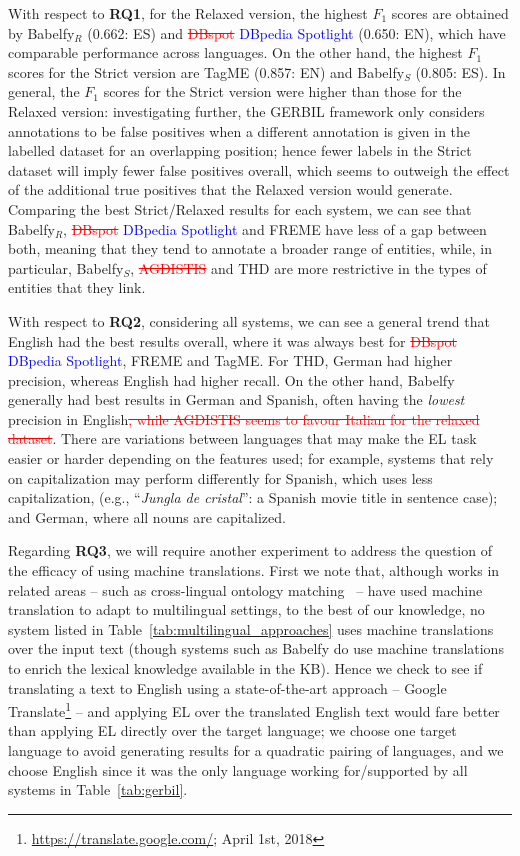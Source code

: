 \documentclass{llncs}
\begin{document}
With respect to \textbf{RQ1}, for the Relaxed version, the highest $F_1$ scores are obtained by Babelfy$_R$ (0.662: ES) and \textcolor{red}{\st{DBspot}} \textcolor{blue}{DBpedia Spotlight} (0.650: EN), which have comparable performance across languages. On the other hand, the highest $F_1$ scores for the Strict version are TagME (0.857: EN) and Babelfy$_S$ (0.805: ES). In general, the $F_1$ scores for the Strict version were higher than those for the Relaxed version: investigating further, the GERBIL framework only considers annotations to be false positives when a different annotation is given in the labelled dataset for an overlapping position; hence fewer labels in the Strict dataset will imply fewer false positives overall, which seems to outweigh the effect of the additional true positives that the Relaxed version would generate. Comparing the best Strict/Relaxed results for each system, we can see that Babelfy$_R$, \textcolor{red}{\st{DBspot}} \textcolor{blue}{DBpedia Spotlight} and FREME have less of a gap between both, meaning that they tend to annotate a broader range of entities, while, in particular, Babelfy$_S$, \textcolor{red}{\st{AGDISTIS}} and THD are more restrictive in the types of entities that they link.

With respect to \textbf{RQ2}, considering all systems, we can see a general trend that English had the best results overall, where it was always best for \textcolor{red}{\st{DBspot}} \textcolor{blue}{DBpedia Spotlight}, FREME and TagME. For THD, German had higher precision, whereas English had higher recall. On the other hand, Babelfy generally had best results in German and Spanish, often having the \textit{lowest} precision in English\textcolor{red}{\st{, while AGDISTIS seems to favour Italian for the relaxed dataset}}. There are variations between languages that may make the EL task easier or harder depending on the features used; for example, systems that rely on capitalization may perform differently for Spanish, which uses less capitalization, (e.g., ``\textit{Jungla de cristal}'': a Spanish movie title in sentence case); and German, where all nouns are capitalized.
\medskip

Regarding \textbf{RQ3}, we will require another experiment to address the question of the efficacy of using machine translations. First we note that, although works in related areas -- such as cross-lingual ontology matching~\cite{FuBO10} -- have used machine translation to adapt to multilingual settings, to the best of our knowledge, no system listed in Table~\ref{tab:multilingual_approaches} uses machine translations over the input text (though systems such as Babelfy do use machine translations to enrich the lexical knowledge available in the KB). Hence we check to see if translating a text to English using a state-of-the-art approach -- Google Translate\footnote{\url{https://translate.google.com/}; April 1st, 2018} -- and applying EL over the translated English text would fare better than applying EL directly over the target language; we choose one target language to avoid generating results for a quadratic pairing of languages, and we choose English since it was the only language working for/supported by all systems in Table~\ref{tab:gerbil}.
\end{document}
